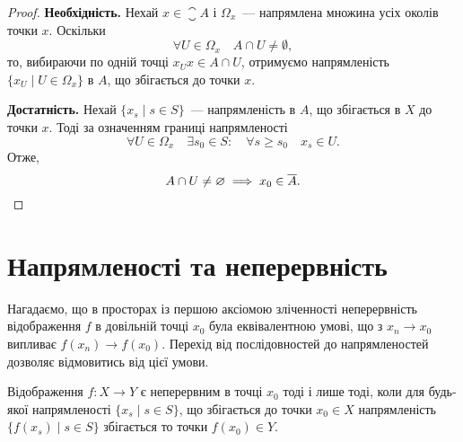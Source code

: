 \begin{proof}
    \textbf{Необхідність.} Нехай $x \in \closure A$ і $\Omega_x$~--- напрямлена множина усіх околів точки $x$. Оскільки
    \begin{equation*}
        \forall U \in \Omega_x \quad A \cap U \ne \emptyset,
    \end{equation*}
    то, вибираючи по одній точці $x_U x \in A \cap U$, отримуємо напрямленість $\{x_U \mid U \in \Omega_x\}$ в $A$, що збігається до точки $x$. 

    \textbf{Достатність.} Нехай $\{x_s \mid s \in S\}$~--- напрямленість в $A$, що збігається в $X$ до точки $x$. Тоді за означенням границі напрямленості
    \begin{equation*}
        \forall U \in \Omega_x \quad \exists s_0 \in S: \quad \forall s \ge s_0 \quad x_s \in U.
    \end{equation*}
    Отже,
    \begin{equation*}
        A \cap U \ne \varnothing \implies x_0 \in \overline{A}. \qedhere
    \end{equation*}
\end{proof}

\section{Напрямленості та неперервність}

\begin{remark}
    Нагадаємо, що в просторах із першою аксіомою зліченності неперервність відображення $f$ в довільній точці $x_0$ була еквівалентною умові, що з $x_n \to x_0$ випливає $f(x_n) \to f(x_0)$. Перехід від послідовностей до напрямленостей дозволяє відмовитись від цієї умови.
\end{remark}

\begin{theorem}
    Відображення $f: X \to Y$ є неперервним в точці $x_0$ тоді і лише тоді, коли для будь-якої напрямленості $\{x_s \mid s \in S\}$, що збігається до точки $x_0 \in X$ напрямленість $\{f(x_s) \mid s \in S\}$ збігається то точки $f(x_0) \in Y$.
\end{theorem}

